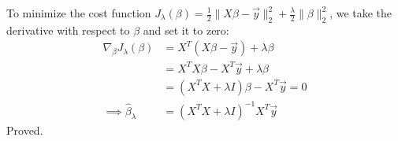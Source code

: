 \begin{answer}
    To minimize the cost function $J_\lambda(\beta)=\frac{1}{2}\|X\beta-\vec{y}\|_2^2+\frac{\lambda}{2}\|\beta\|_2^2$,
    we take the derivative with respect to $\beta$ and set it to zero:
    \begin{align*}
        \nabla_\beta J_\lambda(\beta) &= X^T(X\beta-\vec{y}) + \lambda\beta \\
        &= X^TX\beta - X^T\vec{y} + \lambda\beta \\
        &= (X^TX + \lambda I)\beta - X^T\vec{y} = 0 \\
        \implies \hat{\beta}_\lambda &= (X^TX + \lambda I)^{-1}X^T\vec{y}
    \end{align*}
    Proved.
\end{answer}
